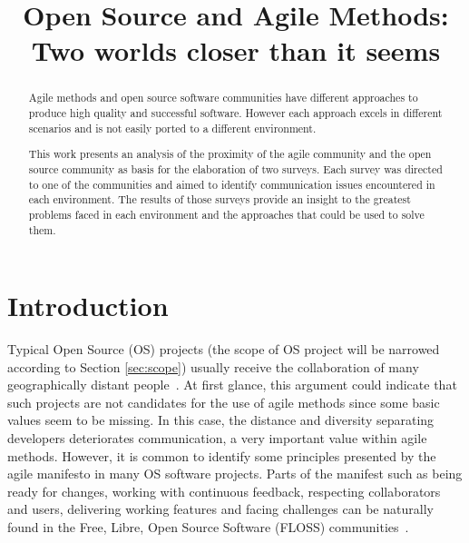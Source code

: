 \documentclass[lnbip]{svmultln}
\begin{document}
\mainmatter

\title{Open Source and Agile Methods:\\Two worlds closer than it
  seems}


\author{}



\institute{}
 
\maketitle

\begin{abstract}
  Agile methods and open source software communities have different
  approaches to produce high quality and successful software. However
  each approach excels in different scenarios and is not easily ported
  to a different environment.

  This work presents an analysis of the proximity of the agile
  community and the open source community as basis for the
  elaboration of two surveys. Each survey was directed to one of the
  communities and aimed to identify communication issues encountered
  in each environment. The results of those surveys provide an insight
  to the greatest problems faced in each environment and the
  approaches that could be used to solve them.

\end{abstract}

\section{Introduction}

Typical Open Source (OS) projects (the scope of OS project will be
narrowed according to Section \ref{sec:scope}) usually receive the
collaboration of many geographically distant
people~\cite{report:dempsey1999}. At first glance, this argument could
indicate that such projects are not candidates for the use of agile
methods since some basic values seem to be missing. In this case, the
distance and diversity separating developers deteriorates
communication, a very important value within agile methods. However,
it is common to identify some principles presented by the agile
manifesto \cite{url:agilemanifesto} in many OS software
projects. Parts of the manifest such as being ready for changes,
working with continuous feedback, respecting collaborators and users,
delivering working features and facing challenges can be naturally
found in the Free, Libre, Open Source Software (FLOSS)
communities~\cite{gabriel2005}.
\end{document}
